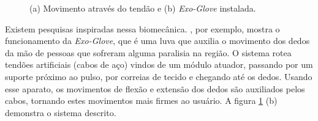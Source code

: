 \documentclass[
	12pt,				%
	openright,			%
	oneside,			%
	a4paper,			%
	english,			%
	brazil				%
	]{abntex2}
\begin{document}
	\begin{figure}[!htb]
		 \centering
		 \caption{(a) Movimento através do tendão e (b) \textit{Exo-Glove} instalada.} 
		 \centering
		 \label{Fig:hand-tendon-flex1-and-exo-glove1}
	\end{figure}


		Existem pesquisas inspiradas nessa biomecânica. \cite{hyunki2015exoglove}, por exemplo, mostra o funcionamento  da \textit{Exo-Glove}, que é uma luva que auxilia o movimento dos dedos da mão de pessoas que sofreram alguma paralisia na região. O sistema rotea tendões artificiais (cabos de aço) vindos de um módulo atuador, passando por um suporte próximo ao pulso, por correias de tecido e chegando até os dedos. Usando esse aparato, os movimentos de flexão e extensão dos dedos são auxiliados pelos cabos, tornando estes movimentos mais firmes ao usuário. A figura \ref{Fig:hand-tendon-flex1-and-exo-glove1} (b) demonstra o sistema descrito.
\end{document}
